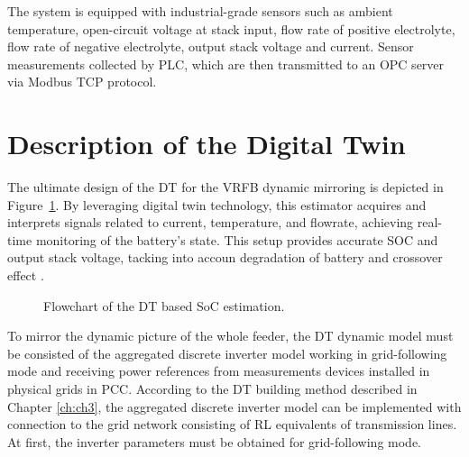 



The system is equipped with industrial-grade sensors such as ambient temperature, open-circuit voltage at stack input, flow rate of positive electrolyte, flow rate of negative electrolyte, output stack voltage and current. Sensor measurements collected by PLC, which are then transmitted to an OPC server via Modbus TCP protocol.

\section{Description of the Digital Twin}\label{sec:ch4/sec2}

The ultimate design of the DT for the VRFB dynamic mirroring is depicted in Figure~\cref{fig:vrfb_dt}. By leveraging digital twin technology, this estimator acquires and interprets signals related to current, temperature, and flowrate, achieving real-time monitoring of the battery's state. This setup provides accurate SOC and output stack voltage, tacking into accoun degradation of battery and crossover effect \autocite{10615087}.

\begin{figure}[htbp]
    \caption{Flowchart of the DT based SoC estimation.}\label{fig:vrfb_dt}
\end{figure}

To mirror the dynamic picture of the whole feeder, the DT dynamic model must be consisted of the aggregated discrete inverter model working in grid-following mode and receiving power references from measurements devices installed in physical grids in PCC. According to the DT building method described in Chapter \ref{ch:ch3}, the aggregated discrete inverter model can be implemented with connection to the grid network consisting of RL equivalents of transmission lines. At first, the inverter parameters must be obtained for grid-following mode. 

